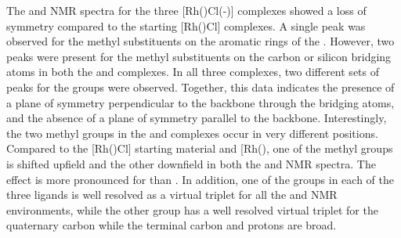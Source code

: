 The \proton{} and \carbon{} NMR spectra for the three [Rh(\tBuxantphos)Cl(-)] complexes showed a loss of symmetry compared to the starting [Rh(\tBuxantphos)Cl] complexes.  A single peak was observed for the methyl substituents on the aromatic rings of the \tButhixantphos{}.  However, two peaks were present for the methyl substituents on the carbon or silicon bridging atoms in both the \tBuxantphos{} and \tBusixantphos{} complexes.  In all three complexes, two different sets of peaks for the \tBu{} groups were observed.  Together, this data indicates the presence of a plane of symmetry perpendicular to the backbone through the bridging atoms, and the absence of a plane of symmetry parallel to the backbone.  Interestingly, the two methyl groups in the \tBusixantphos{} and \tBuxantphos{} complexes occur in very different positions.  Compared to the [Rh(\tBuxantphosk)Cl] starting material and [Rh(\tBuxantphosk)\ce{Cl(H)2]}, one of the methyl groups is shifted upfield and the other downfield in both the \proton{} and \carbon{} NMR spectra.  The effect is more pronounced for \tBuxantphos{} than \tBusixantphos{}.  In addition, one of the \tBu{} groups in each of the three \tBuxantphos{} ligands is well resolved as a virtual triplet for all the \proton{} and \carbon{} NMR environments, while the other \tBu{} group has a well resolved virtual triplet for the quaternary carbon while the terminal carbon and protons are broad.
%

